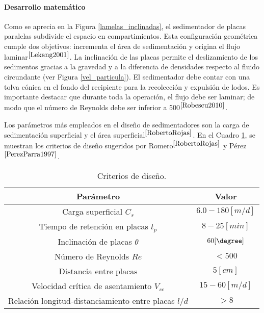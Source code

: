 \paragraph{Desarrollo matem\'atico}

\noindent
\justify

Como se aprecia en la Figura \ref{lamelas_inclinadas}, el sedimentador de placas paralelas subdivide el espacio en compartimientos. Esta configuraci\'on geom\'etrica cumple dos objetivos: incrementa el \'area de sedimentaci\'on y origina el flujo laminar$^{\cite{Lekang2001}}$. La inclinaci\'on de las placas permite el deslizamiento de los sedimentos gracias a la gravedad y a la diferencia de densidades respecto al fluido circundante (ver Figura \ref{vel_particula}). El sedimentador debe contar con una tolva c\'onica en el fondo del recipiente para la recolecci\'on y expulsi\'on de lodos. Es importante destacar que durante toda la operaci\'on, el flujo debe ser laminar; de modo que el n\'umero de Reynolds debe ser inferior a 500$^{\cite{Robescu2010}}$. 

\noindent
\justify

Los par\'ametros m\'as empleados en el dise\~no de sedimentadores son la carga de sedimentaci\'on superficial y el \'area superficial$^{\cite{RobertoRojas}}$. En el Cuadro \ref{critSed}, se muestran los criterios de dise\~no sugeridos por Romero$^{\cite{RobertoRojas}}$ y P\'erez$^{\cite{PerezParra1997}}$.

\begin{table}[h!]
	\centering
	\begin{tabular}{|c|c|}
		\hline
		\textbf{Par\'ametro} & \textbf{Valor} \\ \hline
		Carga superficial $C_s$ & $6.0 - 180 [m/d]$ \\ \hline
		Tiempo de retenci\'on en placas $t_p$ & $8 - 25 [min]$ \\ \hline
		Inclinaci\'on de placas $\theta$ & $60 [\degree]$ \\ \hline
		N\'umero de Reynolds $Re$ & $<500$ \\ \hline
		Distancia entre placas & $5 [cm]$ \\ \hline
		Velocidad cr\'itica de asentamiento $V_{sc}$ & $15 - 60 [m/d]$ \\ \hline
		Relaci\'on longitud-distanciamiento entre placas $l/d$ & $>8$ \\ \hline
	\end{tabular}
	\caption{Criterios de dise\~no.}
	\label{critSed}
\end{table}


